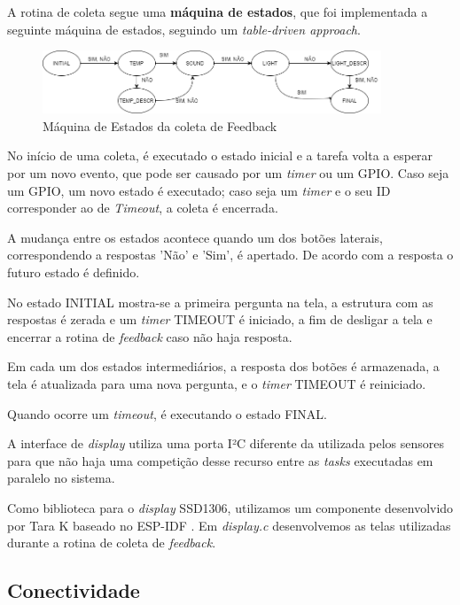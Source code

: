 \documentclass[../monografia.tex]{subfiles}
\begin{document}
A rotina de coleta segue uma \textbf{máquina de estados}, que foi implementada a seguinte máquina de estados, seguindo um \textit{table-driven approach}.

\begin{figure}[h]
	\centering
	\includegraphics[width=0.9\textwidth]{fsm-feedback.png}
	\caption{Máquina de Estados da coleta de Feedback}
	\label{fig:fsm-feedback}
\end{figure}

No início de uma coleta, é executado o estado inicial e a tarefa volta a esperar por um novo evento, que pode ser causado por um \textit{timer} ou um GPIO. Caso seja um GPIO, um novo estado é executado; caso seja um \textit{timer} e o seu ID corresponder ao de \textit{Timeout}, a coleta é encerrada.

A mudança entre os estados acontece quando um dos botões laterais, correspondendo a respostas 'Não' e 'Sim', é apertado. De acordo com a resposta o futuro estado é definido. 

No estado INITIAL mostra-se a primeira pergunta na tela, a estrutura com as respostas é zerada e um \textit{timer} TIMEOUT é iniciado, a fim de desligar a tela e encerrar a rotina de \textit{feedback} caso não haja resposta. 

Em cada um dos estados intermediários, a resposta dos botões é armazenada, a tela é atualizada para uma nova pergunta, e o \textit{timer} TIMEOUT é reiniciado. 

Quando ocorre um \textit{timeout}, é executando o estado FINAL. 

A interface de \textit{display} utiliza uma porta I²C diferente da utilizada pelos sensores para que não haja uma competição desse recurso entre as \textit{tasks} executadas em paralelo no sistema.

Como biblioteca para o \textit{display} SSD1306, utilizamos um componente desenvolvido por Tara K \cite{TaraK} baseado no ESP-IDF \cite{SSD1306}. Em \textit{display.c} desenvolvemos as telas utilizadas durante a rotina de coleta de \textit{feedback}. 


\subsection{Conectividade}
\end{document}

